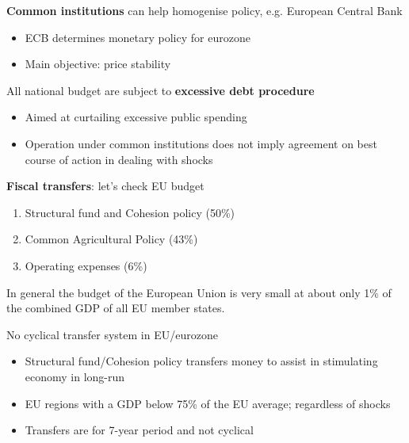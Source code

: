 \documentclass{beamer}
\begin{document}
\begin{frame}
  \textbf{Common institutions} can help homogenise policy, e.g. European Central Bank
  \begin{itemize}
    \item ECB determines monetary policy for eurozone
    \item Main objective: price stability
  \end{itemize}
  \medskip
  All national budget are subject to \textbf{excessive debt procedure}   
  \begin{itemize}
    \item Aimed at curtailing excessive public spending
    \item Operation under common institutions does not imply agreement on best course of action in dealing with shocks
  \end{itemize}
\end{frame}


\begin{frame}
  \textbf{Fiscal transfers}: let's check EU budget
  \begin{enumerate}
    \item Structural fund and Cohesion policy (50\%)
    \item Common Agricultural Policy (43\%)
    \item Operating expenses (6\%)
  \end{enumerate}
  \medskip
  In general the budget of the European Union is very small at about only 1\% of the combined GDP of all EU member states. 
\end{frame}

\begin{frame}
 No cyclical transfer system in EU/eurozone  
  \begin{itemize}
    \item Structural fund/Cohesion policy transfers money to assist in stimulating economy in long-run
    \item EU regions with a GDP below 75\% of the EU average; regardless of shocks
    \item Transfers are for 7-year period and not cyclical
  \end{itemize}
\end{frame}
\end{document}
